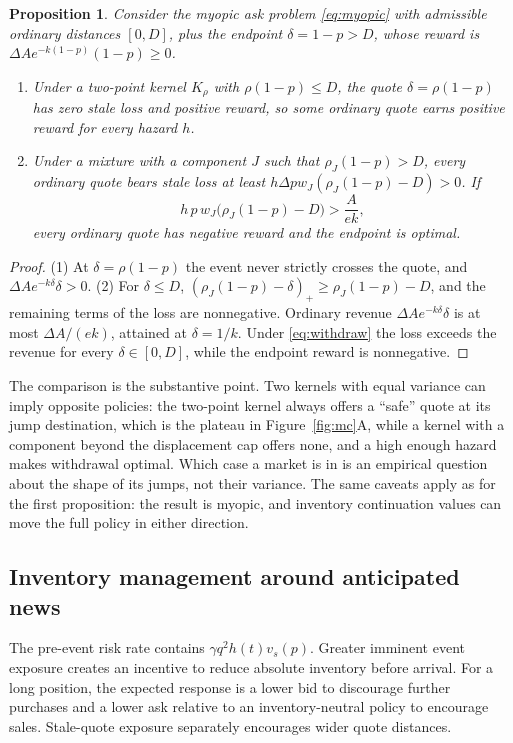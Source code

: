 \documentclass[11pt]{article}
\newcommand{\1}{\mathbf 1}
\newtheorem{proposition}{Proposition}
\begin{document}
\begin{proposition}
Consider the myopic ask problem \eqref{eq:myopic} with admissible ordinary
distances $[0,D]$, plus the endpoint $\delta=1-p>D$, whose reward is
$\Delta Ae^{-k(1-p)}(1-p)\ge0$.
\begin{enumerate}
 \item Under a two-point kernel $K_\rho$ with $\rho(1-p)\le D$, the quote
 $\delta=\rho(1-p)$ has zero stale loss and positive reward, so
 some ordinary quote earns positive reward for every hazard $h$.
 \item Under a mixture with a component $J$ such that $\rho_J(1-p)>D$, every
 ordinary quote bears stale loss at least $h\Delta pw_J(\rho_J(1-p)-D)>0$. If
 \begin{equation}
 h\,p\,w_J\bigl(\rho_J(1-p)-D\bigr)>\frac{A}{ek},
 \label{eq:withdraw}
 \end{equation}
 every ordinary quote has negative reward and the endpoint is optimal.
\end{enumerate}
\end{proposition}
\begin{proof}
(1) At $\delta=\rho(1-p)$ the event never strictly crosses the quote, and
$\Delta Ae^{-k\delta}\delta>0$. (2) For $\delta\le D$,
$(\rho_J(1-p)-\delta)_+\ge\rho_J(1-p)-D$, and the remaining terms of the loss
are nonnegative. Ordinary revenue $\Delta Ae^{-k\delta}\delta$ is at most
$\Delta A/(ek)$, attained at $\delta=1/k$. Under \eqref{eq:withdraw} the loss
exceeds the revenue for every $\delta\in[0,D]$, while the endpoint reward is
nonnegative.
\end{proof}

The comparison is the substantive point. Two kernels with equal variance can
imply opposite policies: the two-point kernel always offers a ``safe'' quote at
its jump destination, which is the plateau in Figure~\ref{fig:mc}A, while a
kernel with a component beyond the displacement cap offers none, and a high
enough hazard makes withdrawal optimal. Which case a market is in is an
empirical question about the shape of its jumps, not their variance.
The same caveats apply as for the first proposition: the result is myopic, and
inventory continuation values can move the full policy in either direction.

\subsection{Inventory management around anticipated news}
The pre-event risk rate contains $\gamma q^2h(t)v_s(p)$. Greater imminent
event exposure creates an incentive to reduce absolute inventory before arrival.
For a long position, the expected response is a lower bid to discourage further
purchases and a lower ask relative to an inventory-neutral policy to encourage
sales. Stale-quote exposure separately encourages wider quote distances.
\end{document}
